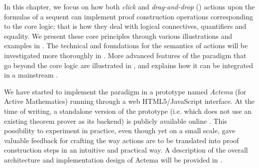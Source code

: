 


In this chapter, we focus on how both \emph{click} and \emph{drag-and-drop}
() actions upon the formulas of a sequent can implement proof construction
operations corresponding to the core logic; that is how they deal with logical
connectives, quantifiers and equality. We present these core principles through
various illustrations and examples in . The technical and
 foundations for the semantics of  actions
will be investigated more thoroughly in .
More advanced features of the  paradigm that go beyond the core
logic are illustrated in , and  explains how it
can be integrated in a mainstream .

We have started to implement the paradigm in a prototype named {\em Actema} (for
Active Mathematics) running through a web HTML5/JavaScript interface. At the
time of writing, a standalone version of the prototype (i.e. which does not use
an existing theorem prover as its backend) is publicly available online
\cite{Actema:link}. This possibility to experiment in practice,
even though yet on a small scale, gave valuable feedback for crafting the way
 actions are to be translated into proof construction steps in an intuitive
and practical way. A description of the overall architecture and implementation
design of Actema will be provided in .

